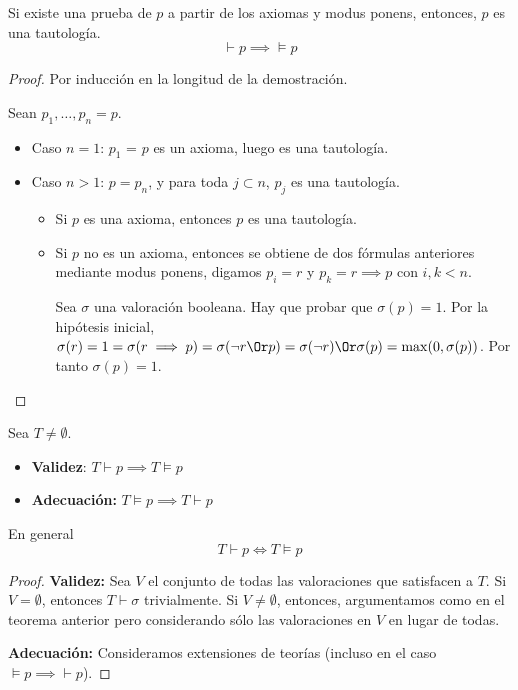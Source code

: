 \begin{theorem}
	Si existe una prueba de $p$ a partir de los axiomas y modus ponens, entonces, $p$ es una tautología.
	$$\vdash p \implies \vDash p$$
\end{theorem}
\begin{proof}
	Por inducción en la longitud de la demostración.

	Sean $p_1,\hdots, p_n=p$.
	\begin{itemize}
		\item Caso $n=1$: $p_1$ = $p$ es un axioma, luego es una tautología.
		\item Caso $n>1$: $p=p_n$, y para toda $j\subset n$, $p_j$ es una tautología.
		\begin{itemize}
			\item Si $p$ es una axioma, entonces $p$ es una tautología.
			\item Si $p$ no es un axioma, entonces se obtiene de dos fórmulas anteriores mediante modus ponens, digamos $p_i = r$ y $p_k=r\implies p$ con $i,k<n$.

			Sea $\sigma$ una valoración booleana. Hay que probar que $\sigma(p) = 1$. Por la hipótesis inicial, $\sigma(r) = 1 = \sigma(r\implies p) = \sigma(\neg r \Or p) = \sigma(\neg r) \Or \sigma(p) = \max(0,\sigma(p))$.
			Por tanto $\sigma(p) = 1$.
		\end{itemize}
	\end{itemize}
\end{proof}

\begin{theorem}	Sea $T \neq \emptyset$.
	\begin{itemize}
		\item \textbf{Validez}:
		$T \vdash p \implies T \vDash p$
		\item \textbf{Adecuación:}
		$T \vDash p \implies T \vdash p$
	\end{itemize}
	En general $$T\vdash p \iff T\vDash p$$
\end{theorem}
\begin{proof}

	\textbf{Validez:} Sea $V$ el conjunto de todas las valoraciones que satisfacen a $T$. Si $V=\emptyset$, entonces $T\vdash \sigma$ trivialmente. Si $V\neq \emptyset$, entonces, argumentamos como en el teorema anterior pero considerando sólo las valoraciones en $V$ en lugar de todas.

	\textbf{Adecuación:} Consideramos extensiones de teorías (incluso en el caso $\vDash p \implies \vdash p$).

\end{proof}

